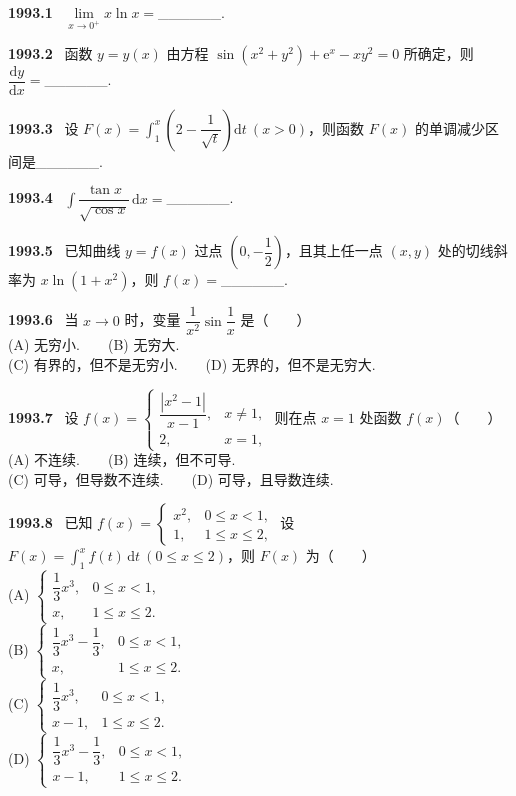 \documentclass[UTF8,12pt]{ctexart}
\newcommand{\qn}[1]{\textbf{\large #1}\ }
\begin{document}
\qn{1993.1}
$\lim\limits_{x\to 0^+}x\ln x=$______.

\vfill
\newpage
\qn{1993.2}
函数 $y=y(x)$ 由方程 $\sin(x^2+y^2)+\mathrm{e}^x-xy^2=0$ 所确定，则 $\dfrac{\mathrm{d}y}{\mathrm{d}x}=$______.

\vfill
\newpage
\qn{1993.3}
设 $F(x)=\int_1^x\left(2-\dfrac{1}{\sqrt{t}}\right)\mathrm{d}t\ (x>0)$，则函数 $F(x)$ 的单调减少区间是______.

\vfill
\newpage
\qn{1993.4}
$\int\dfrac{\tan x}{\sqrt{\cos x}}\,\mathrm{d}x=$______.

\vfill
\newpage
\qn{1993.5}
已知曲线 $y=f(x)$ 过点 $\left(0,-\dfrac{1}{2}\right)$，且其上任一点 $(x,y)$ 处的切线斜率为 $x\ln(1+x^2)$，则 $f(x)=$______.

\vfill
\newpage
\qn{1993.6}
当 $x\to 0$ 时，变量 $\dfrac{1}{x^2}\sin\dfrac{1}{x}$ 是（　　）
\\
\noindent (A) 无穷小.　　(B) 无穷大.
\\
\noindent (C) 有界的，但不是无穷小.　　(D) 无界的，但不是无穷大.

\vfill
\newpage
\qn{1993.7}
设 $f(x)=\begin{cases}\dfrac{|x^2-1|}{x-1}, & x\neq 1,\\ 2, & x=1,\end{cases}$ 则在点 $x=1$ 处函数 $f(x)$（　　）
\\
\noindent (A) 不连续.　　(B) 连续，但不可导.
\\
\noindent (C) 可导，但导数不连续.　　(D) 可导，且导数连续.

\vfill
\newpage
\qn{1993.8}
已知 $f(x)=\begin{cases}x^2, & 0\leqslant x<1,\\ 1, & 1\leqslant x\leqslant 2,\end{cases}$ 设 $F(x)=\int_1^x f(t)\,\mathrm{d}t\ (0\leqslant x\leqslant 2)$，则 $F(x)$ 为（　　）
\\
\noindent (A) $\begin{cases}\dfrac{1}{3}x^3, & 0\leqslant x<1,\\ x, & 1\leqslant x\leqslant 2.\end{cases}$
\\
\noindent (B) $\begin{cases}\dfrac{1}{3}x^3-\dfrac{1}{3}, & 0\leqslant x<1,\\ x, & 1\leqslant x\leqslant 2.\end{cases}$
\\
\noindent (C) $\begin{cases}\dfrac{1}{3}x^3, & 0\leqslant x<1,\\ x-1, & 1\leqslant x\leqslant 2.\end{cases}$
\\
\noindent (D) $\begin{cases}\dfrac{1}{3}x^3-\dfrac{1}{3}, & 0\leqslant x<1,\\ x-1, & 1\leqslant x\leqslant 2.\end{cases}$
\end{document}
